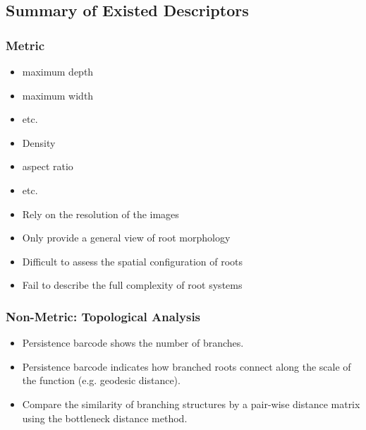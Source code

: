   \subsection{Summary of Existed Descriptors}
         
    \subsubsection{Metric}

          \begin{itemize}
            \item maximum depth
            \item maximum width
            \item etc.
          \end{itemize}
          
          \begin{itemize}
            \item Density
            \item aspect ratio
            \item etc.
          \end{itemize}
          
          \begin{itemize}
            \item Rely on the resolution of the images \cite{balduzzi2017reshaping}

            \item Only provide a general view of root morphology \cite{balduzzi2017reshaping}
            \item Difficult to assess the spatial configuration of roots
            \item Fail to describe the full complexity of root systems
          \end{itemize}
          
      
    \subsubsection{Non-Metric: Topological Analysis}
         
          \begin{itemize}
            \item Persistence barcode shows the number of branches.
            \item Persistence barcode indicates how branched roots connect along the scale of the function (e.g. geodesic distance).
            \item Compare the similarity of branching structures by a pair-wise distance matrix using the bottleneck distance method.
          \end{itemize}
          
